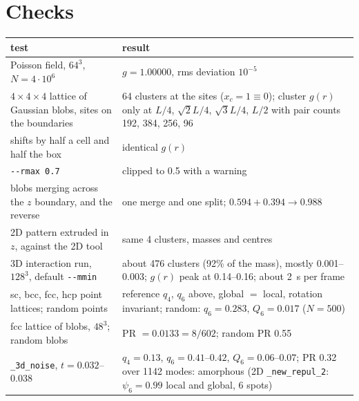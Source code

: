 \documentclass[11pt]{article}
\newcommand{\code}[1]{\texttt{#1}}
\begin{document}
\section{Checks}
\begin{center}
\begin{tabularx}{\textwidth}{@{}L L@{}}
\toprule
test & result \\
\midrule
Poisson field, $64^3$, $N=4\cdot10^6$ & $g=1.00000$, rms deviation $10^{-5}$ \\
$4\times4\times4$ lattice of Gaussian blobs, sites on the boundaries & 64 clusters at the sites ($x_c=1\equiv0$); cluster $g(r)$ only at $L/4$, $\sqrt2L/4$, $\sqrt3L/4$, $L/2$ with pair counts 192, 384, 256, 96 \\
shifts by half a cell and half the box & identical $g(r)$ \\
\code{-{}-rmax 0.7} & clipped to 0.5 with a warning \\
blobs merging across the $z$ boundary, and the reverse & one merge and one split; $0.594+0.394\to0.988$ \\
2D pattern extruded in $z$, against the 2D tool & same 4 clusters, masses and centres \\
3D interaction run, $128^3$, default \code{-{}-mmin} & about 476 clusters (92\% of the mass), mostly 0.001--0.003; $g(r)$ peak at 0.14--0.16; about 2~s per frame \\
sc, bcc, fcc, hcp point lattices; random points & reference $q_4$, $q_6$ above, global $=$ local, rotation invariant; random: $q_6=0.283$, $Q_6=0.017$ ($N=500$) \\
fcc lattice of blobs, $48^3$; random blobs & PR $=0.0133=8/602$; random PR 0.55 \\
\code{\_3d\_noise}, $t=0.032$--$0.038$ & $q_4=0.13$, $q_6=0.41$--$0.42$, $Q_6=0.06$--$0.07$; PR 0.32 over 1142 modes: amorphous (2D \code{\_new\_repul\_2}: $\psi_6=0.99$ local and global, 6 spots) \\
\bottomrule
\end{tabularx}
\end{center}
\end{document}
